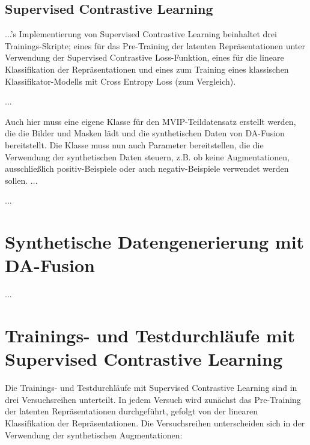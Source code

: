 \subsection{Supervised Contrastive Learning} \label{sec:impl-supcon}






...'s Implementierung von Supervised Contrastive Learning beinhaltet drei Trainings-Skripte; eines für das Pre-Training der latenten Repräsentationen unter Verwendung der Supervised Contrastive Loss-Funktion, eines für die lineare Klassifikation der Repräsentationen und eines zum Training eines klassischen Klassifikator-Modells mit Cross Entropy Loss (zum Vergleich).

...

Auch hier muss eine eigene Klasse für den MVIP-Teildatensatz erstellt werden, die die Bilder und Masken lädt und die synthetischen Daten von DA-Fusion bereitstellt. Die Klasse muss nun auch Parameter bereitstellen, die die Verwendung der synthetischen Daten steuern, z.B. ob keine Augmentationen, ausschließlich positiv-Beispiele oder auch negativ-Beispiele verwendet werden sollen. ...

...

\section{Synthetische Datengenerierung mit DA-Fusion} \label{sec:synt-gen-da-fusion}

...

\section{Trainings- und Testdurchläufe mit Supervised Contrastive Learning} \label{sec:train-test-supcon}

Die Trainings- und Testdurchläufe mit Supervised Contrastive Learning sind in drei Versuchsreihen unterteilt. In jedem Versuch wird zunächst das Pre-Training der latenten Repräsentationen durchgeführt, gefolgt von der linearen Klassifikation der Repräsentationen. Die Versuchsreihen unterscheiden sich in der Verwendung der synthetischen Augmentationen:

